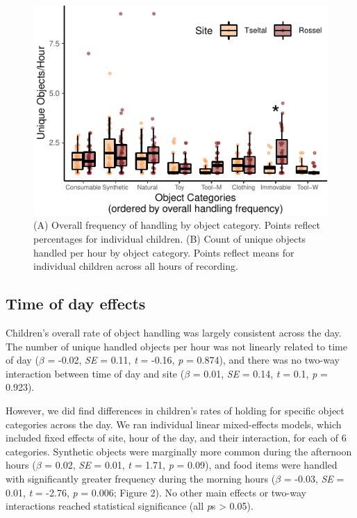 \documentclass[10pt, letterpaper]{article}
\newenvironment{CodeChunk}{}{}
\begin{document}
\begin{CodeChunk}
\begin{figure}[!ht]

{\centering \includegraphics{figs/overall-stats-fig-1} 

}

\caption[(A) Overall frequency of handling by object category]{(A) Overall frequency of handling by object category. Points reflect percentages for individual children. (B) Count of unique objects handled per hour by object category. Points reflect means for individual children across all hours of recording.}\label{fig:overall-stats-fig}
\end{figure}
\end{CodeChunk}

\hypertarget{time-of-day-effects}{%
\subsection{Time of day effects}\label{time-of-day-effects}}

Children's overall rate of object handling was largely consistent across
the day. The number of unique handled objects per hour was not linearly
related to time of day (\(\beta\) = -0.02, \emph{SE} = 0.11, \emph{t} =
-0.16, \emph{p} = 0.874), and there was no two-way interaction between
time of day and site (\(\beta\) = 0.01, \emph{SE} = 0.14, \emph{t} =
0.1, \emph{p} = 0.923).

However, we did find differences in children's rates of holding for
specific object categories across the day. We ran individual linear
mixed-effects models, which included fixed effects of site, hour of the
day, and their interaction, for each of 6 categories. Synthetic objects
were marginally more common during the afternoon hours (\(\beta\) =
0.02, \emph{SE} = 0.01, \emph{t} = 1.71, \emph{p} = 0.09), and food
items were handled with significantly greater frequency during the
morning hours (\(\beta\) = -0.03, \emph{SE} = 0.01, \emph{t} = -2.76,
\emph{p} = 0.006; Figure 2). No other main effects or two-way
interactions reached statistical significance (all \emph{p}s
\textgreater{} 0.05).
\end{document}

